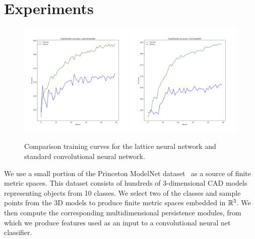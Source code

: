 \documentclass{article}
\begin{document}
\section{Experiments}
\begin{figure}[b]
  \caption{Comparison training curves for the lattice neural network and
    standard convolutional neural network.}\label{fig:comparison}
    \begin{center}
    \includegraphics[width=0.49\textwidth]{lattice_accuracy.png}
    \vspace{0.2cm}
    \includegraphics[width=0.49\textwidth]{conv_accuracy.png}
    \end{center}
    
\end{figure}

We use a small portion of the Princeton ModelNet
dataset~\cite{zhirong_wu_3d_2015} as a source of finite
metric spaces. This dataset consists of hundreds of 3-dimensional CAD models
representing objects from 10 classes. We select two of the classes and sample
points from the 3D models to produce finite metric spaces embedded in $\mathbb{R}^3$.
We then compute the corresponding multidimensional persistence modules, from
which we produce features used as an input to a convolutional neural net
classifier.
\end{document}
